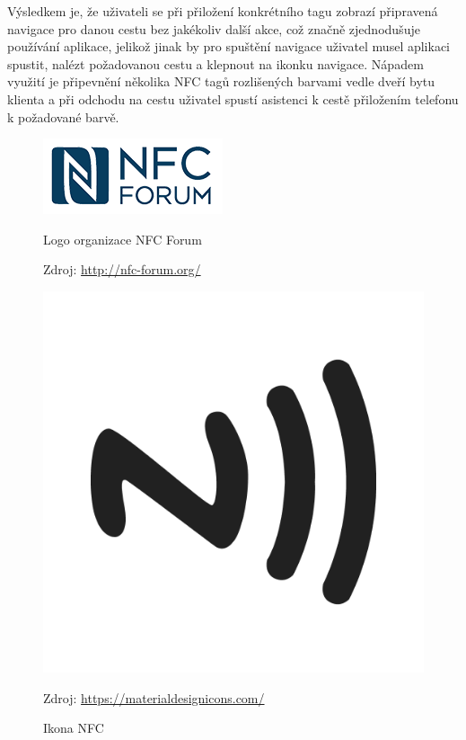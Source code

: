 \documentclass[czech,master,public,dept460,male,java,cpdeclaration]{diploma}
\begin{document}
Výsledkem je, že uživateli se při přiložení konkrétního tagu zobrazí připravená navigace pro danou
cestu bez jakékoliv další akce, což značně zjednodušuje používání aplikace, jelikož jinak by pro spuštění navigace
uživatel musel aplikaci spustit, nalézt požadovanou cestu a klepnout na ikonku navigace. Nápadem
 využití je připevnění několika NFC tagů rozlišených barvami vedle dveří bytu klienta a při odchodu na
 cestu uživatel spustí asistenci k cestě přiložením telefonu k požadované barvě.

\begin{figure}[H]
\begin{minipage}{.5\textwidth}
\centering
                \includegraphics[scale=0.35]{img/nfc-forum-logo.png}
        \caption{Logo organizace NFC Forum}
        \label{fig:nfcforumlogo}
        \centering Zdroj: \url{http://nfc-forum.org/}
\end{minipage}
\begin{minipage}{.5\textwidth}
\centering
                \includegraphics[scale=0.065]{img/nfc-icon.png}
        \caption{Ikona NFC}
        \centering Zdroj: \url{https://materialdesignicons.com/}
        \label{fig:nfcicon}
    \end{minipage}
\end{figure}
\end{document}
